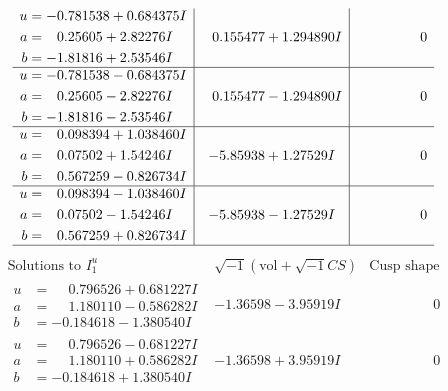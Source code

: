 \documentclass[1p]{elsarticle_modified}
\theoremstyle{definition}
\newcommand{\I}{\sqrt{-1}}
\begin{document}
$$\begin{array}{c|c|c}
\begin{aligned}
u &= -0.781538 + 0.684375 I \\
a &= \phantom{-}0.25605 + 2.82276 I \\
b &= -1.81816 + 2.53546 I\end{aligned}
 & \phantom{-}0.155477 + 1.294890 I & \phantom{-0.000000 } 0 \\ \hline\begin{aligned}
u &= -0.781538 - 0.684375 I \\
a &= \phantom{-}0.25605 - 2.82276 I \\
b &= -1.81816 - 2.53546 I\end{aligned}
 & \phantom{-}0.155477 - 1.294890 I & \phantom{-0.000000 } 0 \\ \hline\begin{aligned}
u &= \phantom{-}0.098394 + 1.038460 I \\
a &= \phantom{-}0.07502 + 1.54246 I \\
b &= \phantom{-}0.567259 - 0.826734 I\end{aligned}
 & -5.85938 + 1.27529 I & \phantom{-0.000000 } 0 \\ \hline\begin{aligned}
u &= \phantom{-}0.098394 - 1.038460 I \\
a &= \phantom{-}0.07502 - 1.54246 I \\
b &= \phantom{-}0.567259 + 0.826734 I\end{aligned}
 & -5.85938 - 1.27529 I & \phantom{-0.000000 } 0\\
 \hline 
 \end{array}$$\newpage$$\begin{array}{c|c|c}  
\text{Solutions to }I^u_{1}& \I (\text{vol} + \sqrt{-1}CS) & \text{Cusp shape}\\
 \hline 
\begin{aligned}
u &= \phantom{-}0.796526 + 0.681227 I \\
a &= \phantom{-}1.180110 - 0.586282 I \\
b &= -0.184618 - 1.380540 I\end{aligned}
 & -1.36598 - 3.95919 I & \phantom{-0.000000 } 0 \\ \hline\begin{aligned}
u &= \phantom{-}0.796526 - 0.681227 I \\
a &= \phantom{-}1.180110 + 0.586282 I \\
b &= -0.184618 + 1.380540 I\end{aligned}
 & -1.36598 + 3.95919 I & \phantom{-0.000000 } 0 \\ \hline\begin{aligned}

\end{aligned}
\end{array}$$
\end{document}
